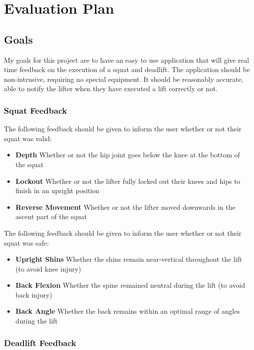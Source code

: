 \section{Evaluation Plan}

\subsection{Goals}

My goals for this project are to have an easy to use application that will give real time feedback on the execution of a squat and deadlift. The application should be non-intrusive, requiring no special equipment. It should be reasonably accurate, able to notify the lifter when they have executed a lift correctly or not.

\subsubsection{Squat Feedback}

The following feedback should be given to inform the user whether or not their squat was valid:

\begin{itemize}
	\item \textbf{Depth} Whether or not the hip joint goes below the knee at the bottom of the squat
	\item \textbf{Lockout} Whether or not the lifter fully locked out their knees and hips to finish in an upright position
	\item \textbf{Reverse Movement} Whether or not the lifter moved downwards in the ascent part of the squat
\end{itemize}

The following feedback should be given to inform the user whether or not their squat was safe:

\begin{itemize}
	\item \textbf{Upright Shins} Whether the shins remain near-vertical throughout the lift (to avoid knee injury)
	\item \textbf{Back Flexion} Whether the spine remained neutral during the lift (to avoid back injury)
	\item \textbf{Back Angle} Whether the back remains within an optimal range of angles during the lift
\end{itemize}

\subsubsection{Deadlift Feedback}

